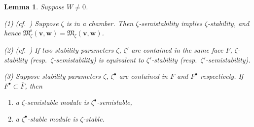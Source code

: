 \documentclass[10pt,a4paper]{amsart}
\newenvironment{aenume}{%
  \begin{enumerate}%
  \renewcommand{\theenumi}{\alph{enumi}}%
  \renewcommand{\labelenumi}{\textup{(\theenumi)}}%
  }{\end{enumerate}}
\newtheorem{Lemma}[equation]{Lemma}
\theoremstyle{definition}
\numberwithin{equation}{section}
\newcommand{\M}{{\mathfrak M}} %
\newcommand{\Mreg}{\M^{\operatorname{s}}}
\newcommand{\bv}{{\mathbf v}} %
\newcommand{\bw}{{\mathbf w}} %
\begin{document}
\begin{Lemma}\label{lem:face}
  Suppose $W\neq 0$.

  \textup{(1) (cf.\ \cite[2.8]{Na-quiver})} Suppose $\zeta$ is in a
  chamber. Then $\zeta$-semistability implies $\zeta$-stability, and hence
  $\Mreg_\zeta(\bv,\bw) = \M_\zeta(\bv,\bw)$.

  \textup{(2) (cf.\ \cite[1.4]{Na-ADHM})} If two stability parameters
  $\zeta$, $\zeta'$ are contained in the same face $F$,
  $\zeta$-stability \textup(resp.\ $\zeta$-semistability\textup) is
  equivalent to $\zeta'$-stability \textup(resp.\
  $\zeta'$-semistability\textup).

  \textup{(3)} Suppose stability parameters $\zeta$, $\zeta^\bullet$ are
  contained in $F$ and $F^\bullet$ respectively. If $F^\bullet\subset
  \overline{F}$, then
  \begin{aenume}\itemsep=0pt
    \item a $\zeta$-semistable module is $\zeta^\bullet$-semistable,
    \item a $\zeta^\bullet$-stable module is $\zeta$-stable.
  \end{aenume}
\end{Lemma}
\end{document}
